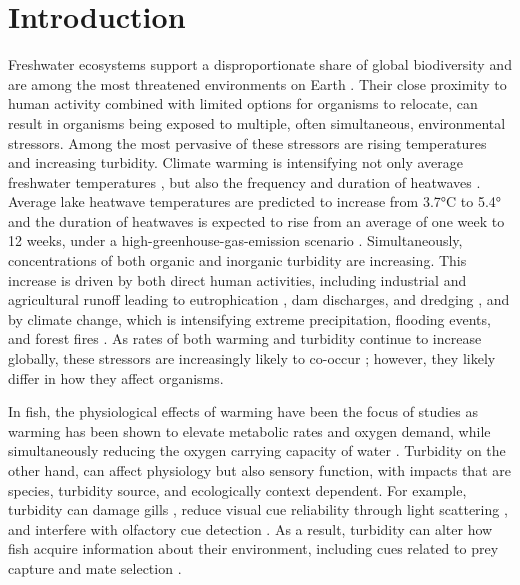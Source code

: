\documentclass[ASNA,twocolumn]{USG} %
\begin{document}
\section{Introduction}\label{sec1}
Freshwater ecosystems support a disproportionate share of global biodiversity \citep{carretevegaWhyAreThere2012} and are among the most threatened environments on Earth \citep{albertScientistsWarningHumanity2021,dudgeonFreshwaterBiodiversityImportance2006}. Their close proximity to human activity combined with limited options for organisms to relocate, can result in organisms being exposed to multiple, often simultaneous, environmental stressors. Among the most pervasive of these stressors are rising temperatures and increasing turbidity. Climate warming is intensifying not only average freshwater temperatures \citep{dokulilIncreasingMaximumLake2021,barbarossaThreatsGlobalWarming2021}, but also the frequency and duration of heatwaves \citep{woolwayLakeHeatwavesClimate2021}. Average lake heatwave temperatures are predicted to increase from 3.7°C to 5.4° and the duration of heatwaves is expected to rise from an average of one week to 12 weeks, under a high-greenhouse-gas-emission scenario \citep{woolwayLakeHeatwavesClimate2021}. Simultaneously, concentrations of both organic and inorganic turbidity are increasing. This increase is driven by both direct human activities, including industrial and agricultural runoff leading to eutrophication \citep{schindlerEutrophicationRecoveryExperimental1974}, dam discharges, and dredging \citep{luNumericalStudyRemote2019,yanEffectsSedimentDredging2023}, and by climate change, which is intensifying extreme precipitation, flooding events, and forest fires \citep{bussiModellingFutureImpacts2016, monierClimateChangeImpacts2015}. As rates of both warming and turbidity continue to increase globally, these stressors are increasingly likely to co-occur \citep{luisvalGlobalChangePhysiological2022}; however, they likely differ in how they affect organisms. 

In fish, the physiological effects of warming have been the focus of studies as warming has been shown to elevate metabolic rates and oxygen demand, while simultaneously reducing the oxygen carrying capacity of water \citep{baileyLinksBehaviourMetabolic2022, holtClimateChangeFish2015,littleWhatWarmingWaters2020}. Turbidity on the other hand, can affect physiology but also sensory function, with impacts that are species, turbidity source, and ecologically context dependent. For example, turbidity can damage gills \citep{cummingGillStructuralChange2016}, reduce visual cue reliability through light scattering \citep{niemanVisualDetectionThresholds2018}, and interfere with olfactory cue detection \citep{aurangzebOlfactorySensoryNeurons2025}. As a result, turbidity can alter how fish acquire information about their environment, including cues related to prey capture and mate selection \citep{zanghiImpactIncreasingTurbidity2025}.
\end{document}
